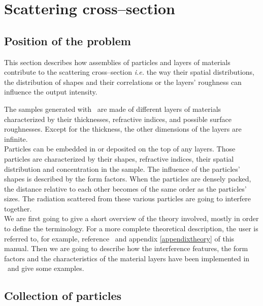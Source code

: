 \chapter{Scattering cross--section}  

\section{Position of the problem} 

This section describes how assemblies of particles and layers of materials contribute to the scattering cross--section \textit{i.e.} the way their spatial distributions, the distribution of shapes and their correlations or the layers' roughness can influence the output intensity. 

The samples generated with \BornAgain\ are made of different layers of materials characterized by their thicknesses, refractive indices, and possible surface roughnesses. Except for the thickness, the other dimensions of the layers are infinite.\\ Particles can be embedded in or deposited on the top of any layers. Those particles are characterized by their shapes, refractive indices, their spatial distribution and concentration in the sample. The influence of the particles' shapes is described by the form factors. When the particles are densely packed, the distance relative to each other becomes of the same order as the particles' sizes. The radiation scattered from these various particles are going to interfere together. \\ We are first going to give a short overview of the theory involved, mostly in order to define the terminology. For a more complete theoretical description, the user is referred to, for example, reference~\cite{ReLa09} and appendix \ref{appendixtheory} of this manual. Then we are going to describe how the interference features, the form factors and the characteristics of the material layers have been implemented in \BornAgain\ and  give some examples.


\section{Collection of particles} 

